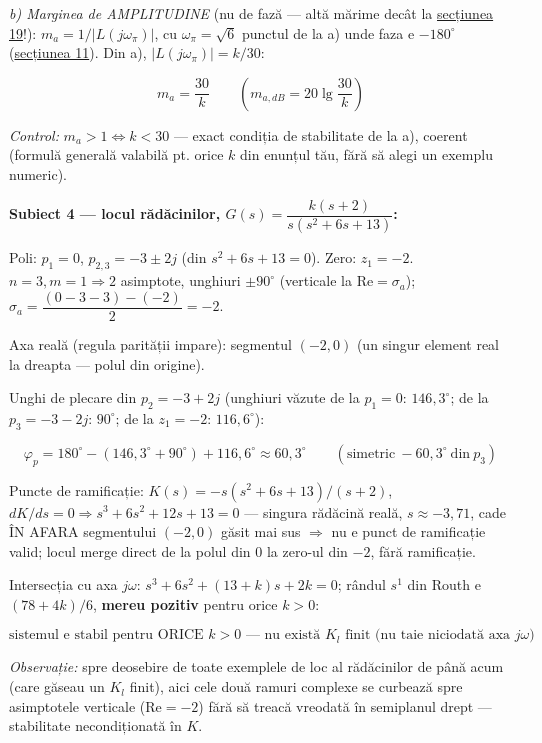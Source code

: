 \documentclass[10pt,a4paper]{article}
\newcommand{\tip}[1]{\textcolor{blue!55!black}{#1}}
\begin{document}
\textit{b) Marginea de AMPLITUDINE} (nu de fază — altă mărime decât la \hyperref[sec:19]{secțiunea 19}!): $m_a{=}1/|L(j\omega_\pi)|$, cu $\omega_\pi{=}\sqrt6$ punctul de la a) unde faza e $-180^\circ$ (\hyperref[sec:11]{secțiunea 11}). Din a), $|L(j\omega_\pi)|{=}k/30$:
\begin{keyeq}\color{red!65!black}
$$m_a=\dfrac{30}k\qquad(m_{a,dB}=20\lg\dfrac{30}k)$$
\end{keyeq}
\tip{\textit{Control:} $m_a{>}1\iff k{<}30$ — exact condiția de stabilitate de la a), coerent (formulă generală valabilă pt. orice $k$ din enunțul tău, fără să alegi un exemplu numeric).}

\textbf{Subiect 4 — locul rădăcinilor, $G(s)=\dfrac{k(s+2)}{s(s^2+6s+13)}$:}

Poli: $p_1{=}0$, $p_{2,3}{=}{-}3{\pm}2j$ (din $s^2{+}6s{+}13{=}0$). Zero: $z_1{=}{-}2$. $n{=}3,m{=}1\Rightarrow2$ asimptote, unghiuri $\pm90^\circ$ (verticale la $\mathrm{Re}{=}\sigma_a$); $\sigma_a{=}\dfrac{(0{-}3{-}3)-({-}2)}2{=}{-}2$.

Axa reală (regula parității impare): segmentul $(-2,0)$ (un singur element real la dreapta — polul din origine).

Unghi de plecare din $p_2{=}{-}3{+}2j$ (unghiuri văzute de la $p_1{=}0$: $146{,}3^\circ$; de la $p_3{=}{-}3{-}2j$: $90^\circ$; de la $z_1{=}{-}2$: $116{,}6^\circ$):
\begin{keyeq}\color{red!65!black}
$$\varphi_p=180^\circ-(146{,}3^\circ+90^\circ)+116{,}6^\circ\approx60{,}3^\circ\qquad(\text{simetric}\ {-}60{,}3^\circ\ \text{din}\ p_3)$$
\end{keyeq}

Puncte de ramificație: $K(s){=}{-}s(s^2{+}6s{+}13)/(s{+}2)$, $dK/ds{=}0\Rightarrow s^3{+}6s^2{+}12s{+}13{=}0$ — singura rădăcină reală, $s{\approx}{-}3{,}71$, cade ÎN AFARA segmentului $(-2,0)$ găsit mai sus $\Rightarrow$ nu e punct de ramificație valid; locul merge direct de la polul din $0$ la zero-ul din $-2$, fără ramificație.

Intersecția cu axa $j\omega$: $s^3{+}6s^2{+}(13{+}k)s{+}2k{=}0$; rândul $s^1$ din Routh e $(78{+}4k)/6$, \textbf{mereu pozitiv} pentru orice $k{>}0$:
\begin{keyeq}\color{red!65!black}
$$\text{sistemul e stabil pentru ORICE }k>0\text{ — nu există }K_l\text{ finit (nu taie niciodată axa }j\omega\text{)}$$
\end{keyeq}
\tip{\textit{Observație:} spre deosebire de toate exemplele de loc al rădăcinilor de până acum (care găseau un $K_l$ finit), aici cele două ramuri complexe se curbează spre asimptotele verticale ($\mathrm{Re}{=}{-}2$) fără să treacă vreodată în semiplanul drept — stabilitate necondiționată în $K$.}
\end{document}
